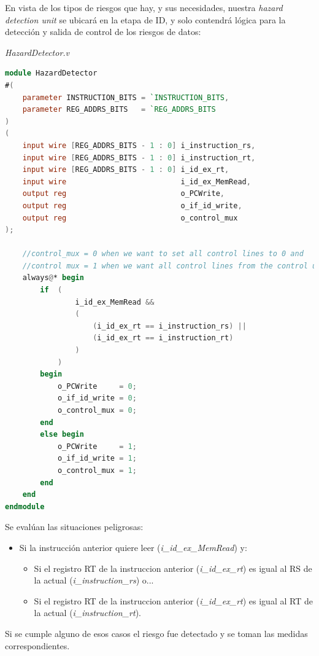 \documentclass[12pt]{article}
\begin{document}
\noindent En vista de los tipos de riesgos que hay, y sus necesidades, nuestra \textit{hazard detection unit} se ubicará en la etapa de ID, y solo contendrá lógica para la detección y salida de control de los riesgos de datos:

\noindent \textit{HazardDetector.v}
\begin{lstlisting}[language=verilog]
module HazardDetector
#(
    parameter INSTRUCTION_BITS = `INSTRUCTION_BITS,
    parameter REG_ADDRS_BITS   = `REG_ADDRS_BITS
)
(
    input wire [REG_ADDRS_BITS - 1 : 0] i_instruction_rs,
    input wire [REG_ADDRS_BITS - 1 : 0] i_instruction_rt,
    input wire [REG_ADDRS_BITS - 1 : 0] i_id_ex_rt,
    input wire                          i_id_ex_MemRead,
    output reg                          o_PCWrite,
    output reg                          o_if_id_write,
    output reg                          o_control_mux
);

    //control_mux = 0 when we want to set all control lines to 0 and
    //control mux = 1 when we want all control lines from the control unit
    always@* begin
        if  (
                i_id_ex_MemRead &&
                (
                    (i_id_ex_rt == i_instruction_rs) ||
                    (i_id_ex_rt == i_instruction_rt)
                )
            )
        begin
            o_PCWrite     = 0;
            o_if_id_write = 0;
            o_control_mux = 0;
        end
        else begin
            o_PCWrite     = 1;
            o_if_id_write = 1;
            o_control_mux = 1;
        end
    end
endmodule

\end{lstlisting}

\noindent Se evalúan las situaciones peligrosas:
\begin{itemize}
  \item Si la instrucción anterior quiere leer (\textit{i\_id\_ex\_MemRead}) y:
  \begin{itemize}
    \item Si el registro RT de la instruccion anterior (\textit{i\_id\_ex\_rt}) es igual al RS de la actual (\textit{i\_instruction\_rs}) o...
    \item Si el registro RT de la instruccion anterior (\textit{i\_id\_ex\_rt}) es igual al RT de la actual (\textit{i\_instruction\_rt}).
  \end{itemize}
\end{itemize}

\noindent Si se cumple alguno de esos casos el riesgo fue detectado y se toman las medidas correspondientes.
\end{document}
